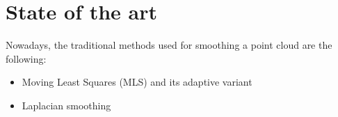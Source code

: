 \chapter{State of the art}


Nowadays, the traditional methods used for smoothing a point cloud are the
following:
\begin{itemize}
    \item Moving Least Squares (MLS) and its adaptive variant
    \item Laplacian smoothing
\end{itemize}

